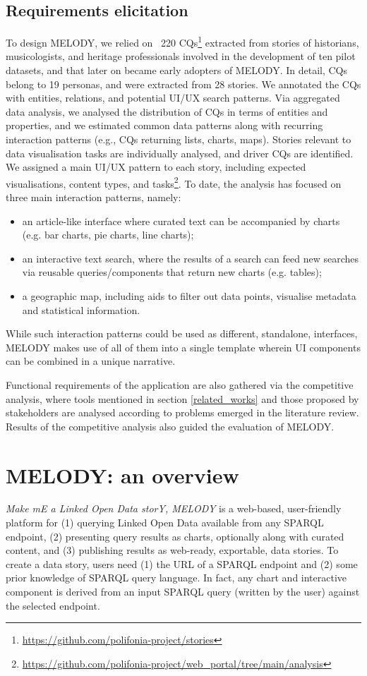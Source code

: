 \documentclass[manuscript]
{acmart}
\begin{document}
\subsection{Requirements elicitation}
To design MELODY, we relied on ~220 CQs\footnote{\url{https://github.com/polifonia-project/stories}} extracted from stories of historians, musicologists, and heritage professionals involved in the development of ten pilot datasets, and that later on became early adopters of MELODY. In detail, CQs belong to 19 personas, and were extracted from 28 stories. We annotated the CQs with entities, relations, and potential UI/UX search patterns. Via aggregated data analysis, we analysed the distribution of CQs in terms of entities and properties, and we estimated common data patterns along with recurring interaction patterns (e.g., CQs returning lists, charts, maps). Stories relevant to data visualisation tasks are individually analysed, and driver CQs are identified. We assigned a main UI/UX pattern to each story, including expected visualisations, content types, and tasks\footnote{\url{https://github.com/polifonia-project/web_portal/tree/main/analysis}}. To date, the analysis has focused on three main interaction patterns, namely:
\begin{itemize}
    \item an article-like interface where curated text can be accompanied by charts (e.g. bar charts, pie charts, line charts);
    \item an interactive text search, where the results of a search can feed new searches via reusable queries/components that return new charts (e.g. tables); 
    \item a geographic map, including aids to filter out data points, visualise metadata and statistical information.
\end{itemize}
While such interaction patterns could be used as different, standalone, interfaces, MELODY makes use of all of them into a single template wherein UI components can be combined in a unique narrative.

Functional requirements of the application are also gathered via the competitive analysis, where tools mentioned in section \ref{related_works} and those proposed by stakeholders are analysed according to problems emerged in the literature review. Results of the competitive analysis also guided the evaluation of MELODY.

\section{MELODY: an overview} \label{overview}
{\itshape Make mE a Linked Open Data storY, MELODY} is a web-based, user-friendly platform for (1) querying Linked Open Data available from any SPARQL endpoint, (2) presenting query results as charts, optionally along with curated content, and (3) publishing results as web-ready, exportable, data stories. To create a data story, users need (1) the URL of a SPARQL endpoint and (2) some prior knowledge of SPARQL query language. In fact, any chart and interactive component is derived from an input SPARQL query (written by the user) against the selected endpoint.
\end{document}
